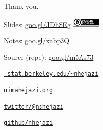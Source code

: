\documentclass[12pt,t,handout]{beamer}
\begin{document}
\begin{frame}[c]{Thank you.}

\Large
Slides: \href{https://goo.gl/JDhSEg}{goo.gl/JDhSEg} \quad
\includegraphics[height=5mm]{Figs/cc-zero.png}

\vspace{3mm}
Notes: \href{https://goo.gl/xabp3Q}{goo.gl/xabp3Q}

\vspace{3mm}
Source (repo): \href{https://goo.gl/m5As73}{goo.gl/m5As73}

\vspace{3mm}
\href{https://www.stat.berkeley.edu/~nhejazi}{\tt
  stat.berkeley.edu/\textasciitilde{}nhejazi}

\vspace{3mm}
\href{http://nimahejazi.org}{\tt nimahejazi.org}

\vspace{3mm}
\href{https://twitter.com/nshejazi}{\tt twitter/@nshejazi}

\vspace{3mm}
\href{https://github.com/nhejazi}{\tt github/nhejazi}


\end{frame}

\end{document}
